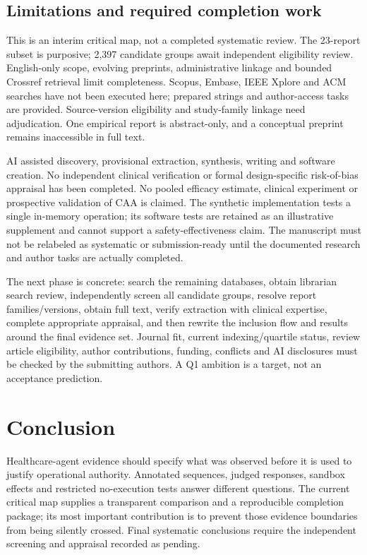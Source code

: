 \documentclass[journal,10pt]{IEEEtran}
\begin{document}
\subsection{Limitations and required completion work}
This is an interim critical map, not a completed systematic review. The 23-report subset is purposive; 2,397 candidate groups await independent eligibility review. English-only scope, evolving preprints, administrative linkage and bounded Crossref retrieval limit completeness. Scopus, Embase, IEEE Xplore and ACM searches have not been executed here; prepared strings and author-access tasks are provided. Source-version eligibility and study-family linkage need adjudication. One empirical report is abstract-only, and a conceptual preprint remains inaccessible in full text.

AI assisted discovery, provisional extraction, synthesis, writing and software creation. No independent clinical verification or formal design-specific risk-of-bias appraisal has been completed. No pooled efficacy estimate, clinical experiment or prospective validation of CAA is claimed. The synthetic implementation tests a single in-memory operation; its software tests are retained as an illustrative supplement and cannot support a safety-effectiveness claim. The manuscript must not be relabeled as systematic or submission-ready until the documented research and author tasks are actually completed.

The next phase is concrete: search the remaining databases, obtain librarian search review, independently screen all candidate groups, resolve report families/versions, obtain full text, verify extraction with clinical expertise, complete appropriate appraisal, and then rewrite the inclusion flow and results around the final evidence set. Journal fit, current indexing/quartile status, review article eligibility, author contributions, funding, conflicts and AI disclosures must be checked by the submitting authors. A Q1 ambition is a target, not an acceptance prediction.

\section{Conclusion}
Healthcare-agent evidence should specify what was observed before it is used to justify operational authority. Annotated sequences, judged responses, sandbox effects and restricted no-execution tests answer different questions. The current critical map supplies a transparent comparison and a reproducible completion package; its most important contribution is to prevent those evidence boundaries from being silently crossed. Final systematic conclusions require the independent screening and appraisal recorded as pending.
\end{document}
